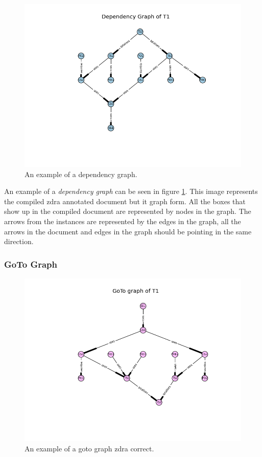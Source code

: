 \begin{figure}[H]
\centering
\includegraphics[scale=0.5]{Figures/zdra/depgraph.png}
\caption{An example of a dependency graph. \label{fig:depgraph}}
\end{figure}

An example of a \emph{dependency graph} can be seen in figure \ref{fig:depgraph}. This image represents the compiled \gls{zdra} annotated document but it graph form. All the boxes that show up in the compiled document are represented by nodes in the graph. The arrows from the instances are represented by the edges in the graph, all the arrows in the document and edges in the graph should be pointing in the same direction.


\subsubsection{GoTo Graph}

\begin{figure}[H]
\centering
\includegraphics[scale=0.5]{Figures/zdra/gotograph.png}
\caption{An example of a goto graph \gls{zdra} correct. \label{fig:gotograph}}
\end{figure}

